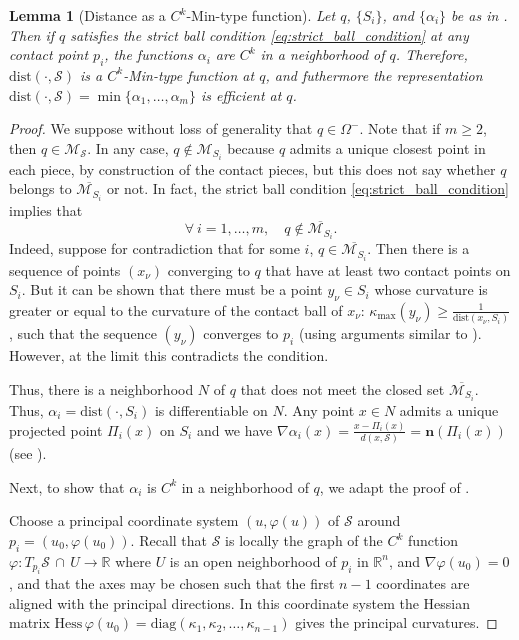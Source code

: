 \documentclass[11pt]{article}
\newcommand{\R}{\mathbb{R}}
\newcommand{\nbf}{\mathbf{n}}
\newcommand{\W}{\Omega}
\newcommand{\kap}{\kappa}
\newcommand{\kapmax}{\kappa_{\text{max}}}
\newcommand{\inter}{\cap}
\newcommand{\dist}{\mathrm{dist}}
\newcommand{\Surf}{\mathcal{S}}
\newcommand{\grad}{\nabla}
\newcommand{\Hess}{\mathrm{Hess}}
\theoremstyle{plain}
\newtheorem{lem}{Lemma}
\theoremstyle{definition}
\theoremstyle{remark}
\begin{document}
\begin{lem}[Distance as a $C^k$-Min-type function]
	\label{lem:dist_as_min_type}
	Let $q$, $\{S_i\}$, and $\{\alpha_i\}$ be as in . 
	Then if $q$ satisfies the strict ball condition \eqref{eq:strict_ball_condition} at any contact point $p_i$, the functions $\alpha_i$ are $C^k$ in a neighborhood of $q$.
	Therefore, $\dist(\cdot, \Surf)$ is a $C^k$-Min-type function at $q$, and futhermore the representation $\dist(\cdot, \Surf) = \min \{\alpha_1,\ldots,\alpha_m\}$ is efficient at $q$.

\end{lem}
\begin{proof}
We suppose without loss of generality that $q \in \W^-$. Note that if $m \geq 2$, then $q \in \mathcal{M}_{\Surf}$. In any case, $q \notin \mathcal{M}_{S_i}$ because $q$ admits a unique closest point in each piece, by construction of the contact pieces, but this does not say whether $q$ belongs to $\overline{\mathcal{M}_{S_i}}$ or not. In fact, the strict ball condition \eqref{eq:strict_ball_condition} implies that
	\begin{equation} \label{eq:not_in_pieces_cut_locus}
		\forall\ i = 1,\ldots,m, \quad q \notin \overline{\mathcal{M}_{S_i}}.
	\end{equation}
Indeed, suppose for contradiction that for some $i$, $q \in \overline{\mathcal{M}_{S_i}}$. Then there is a sequence of points $(x_\nu)$ converging to $q$ that have at least two contact points on $S_i$. But it can be shown that there must be a point $y_\nu \in S_i$ whose curvature is greater or equal to the curvature of the contact ball of $x_\nu$: $\kapmax(y_\nu) \geq \frac{1}{\dist(x_\nu, S_i)} $, such that the sequence $(y_\nu)$ converges to $p_i$ (using arguments similar to \cite{niyogi_finding_2008}). 
However, at the limit this contradicts the condition.

Thus, there is a neighborhood $N$ of $q$ that does not meet the closed set $\overline{\mathcal{M}_{S_i}}$. Thus, $\alpha_i = \dist(\cdot, S_i)$ is differentiable on $N$. Any point $x \in N$ admits a unique projected point $\Pi_i(x)$ on $S_i$ and we have $\grad \alpha_i(x) = \frac{x - \Pi_i(x)}{d(x,\Surf)} = \nbf(\Pi_i(x))$ (see ). 

Next, to show that $\alpha_i$ is $C^k$ in a neighborhood of $q$, we adapt the proof of \cite[Lemma 14.16]{gilbarg_elliptic_1977}.

Choose a principal coordinate system $(u,\varphi(u))$ of $\Surf$ around $p_i = (u_0, \varphi(u_0))$. Recall that $\Surf$ is locally the graph of the $C^k$ function $\varphi : T_{p_i}\Surf \, \inter \, U \to \R$ where $U$ is an open neighborhood of $p_i$ in $\R^n$, and $\grad \varphi(u_0) = 0$, and that the axes may be chosen such that the first $n-1$ coordinates are aligned with the principal directions. In this coordinate system the Hessian matrix $\Hess \, \varphi(u_0) = \text{diag}\left( \kap_1,\kap_2,\ldots,\kap_{n-1} \right)$ gives the principal curvatures.


\end{proof}
\end{document}
